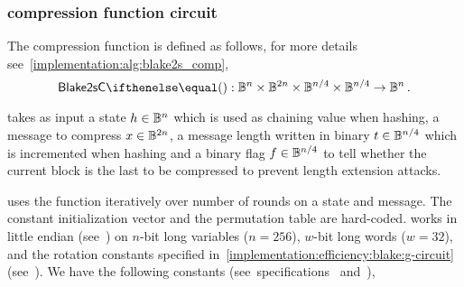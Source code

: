 \subsubsection{ compression function circuit}\label{implementation:efficiency:blake:comp-circuit}

The compression function is defined as follows, for more details see~\cref{implementation:alg:blake2s_comp},
\[
  \blake{2sC}{} : \BB^n \times \BB^{2n} \times \BB^{n/4} \times \BB^{n/4} \to \BB^n\,.
\]

 takes as input a state $h \in \mathbb{B}^n$ which is used as chaining value when hashing, a message to compress $x \in \mathbb{B}^{2n}$, a message length written in binary $t \in \mathbb{B}^{n/4}$ which is incremented when hashing and a binary flag $f \in \mathbb{B}^{n/4}$ to tell whether the current block is the last to be compressed to prevent length extension attacks.

 uses the \blakeG function iteratively over \blakeRound number of rounds on a state and message. The constant initialization vector \blakeIV{} and the permutation table \blakePermutation{} are hard-coded.  works in little endian (see~\cite[Section 2.4]{blakecompietf}) on $n$-bit long variables ($n = 256$), $w$-bit long words ($w = 32$), and the rotation constants specified in~\cref{implementation:efficiency:blake:g-circuit} (see~\cite[Section 2.1]{blakecompietf}). We have the following constants (see~specifications~\cite{aumasson2013blake2} and~\cite[Section 2.2]{blakecompietf}),

